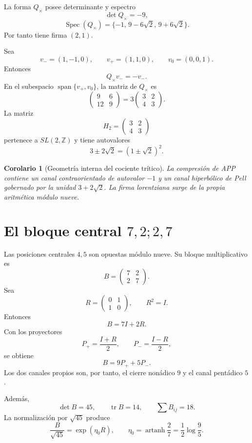 \documentclass[11pt,a4paper]{article}
\newtheorem{corolario}[teorema]{Corolario}
\newcommand{\Z}{\mathbb Z}
\newcommand{\Tr}{\operatorname{tr}}
\newcommand{\Span}{\operatorname{span}}
\begin{document}
La forma $Q_\times$ posee determinante y espectro
\[
\det Q_\times=-9,
\]
\[
\operatorname{Spec}(Q_\times)
=
\{-1,\,9-6\sqrt2,\,9+6\sqrt2\}.
\]
Por tanto tiene firma $(2,1)$.

Sea
\[
v_-=(1,-1,0),\qquad
v_+=(1,1,0),\qquad
v_0=(0,0,1).
\]
Entonces
\[
Q_\times v_-=-v_-.
\]
En el subespacio $\Span\{v_+,v_0\}$, la matriz de $Q_\times$ es
\[
\begin{pmatrix}
9&6\\
12&9
\end{pmatrix}
=3
\begin{pmatrix}
3&2\\
4&3
\end{pmatrix}.
\]
La matriz
\[
H_2=
\begin{pmatrix}
3&2\\
4&3
\end{pmatrix}
\]
pertenece a $SL(2,\Z)$ y tiene autovalores
\[
3\pm2\sqrt2=(1\pm\sqrt2)^2.
\]

\begin{corolario}[Geometría interna del cociente trítico]
La compresión de APP contiene un canal contraorientado de autovalor $-1$ y un canal hiperbólico de Pell gobernado por la unidad $3+2\sqrt2$. La firma lorentziana surge de la propia aritmética módulo nueve.
\end{corolario}

\section{El bloque central $7,2;2,7$}

Las posiciones centrales $4,5$ son opuestas módulo nueve. Su bloque multiplicativo es
\[
\boxed{
B=
\begin{pmatrix}
7&2\\
2&7
\end{pmatrix}.}
\]
Sea
\[
R=
\begin{pmatrix}
0&1\\
1&0
\end{pmatrix},
\qquad R^2=I.
\]
Entonces
\[
B=7I+2R.
\]
Con los proyectores
\[
P_+=\frac{I+R}{2},
\qquad
P_-=\frac{I-R}{2},
\]
se obtiene
\[
\boxed{B=9P_+ +5P_-.}
\]
Los dos canales propios son, por tanto, el cierre nonádico $9$ y el canal pentádico $5$.

Además,
\[
\det B=45,
\qquad
\Tr B=14,
\qquad
\sum B_{ij}=18.
\]
La normalización por $\sqrt{45}$ produce
\[
\frac{B}{\sqrt{45}}=
\exp(\eta_0R),
\qquad
\eta_0=\operatorname{artanh}\frac27
=\frac12\log\frac95.
\]
\end{document}
